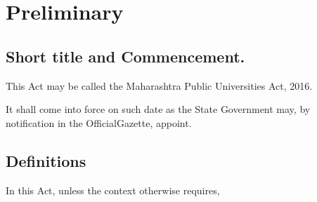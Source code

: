 \documentclass[default]{mhact}
\begin{document}
      \chapter{Preliminary}
      

      \section{Short title and Commencement.}
      

      \begin{subsectionlist}
    

This Act may be called the Maharashtra Public Universities Act, 2016.


It shall come into force on such date as the State Government may, by notification in the OfficialGazette, appoint.

       \end{subsectionlist}
    
      \section{Definitions}
      
In this Act, unless the context otherwise requires,
\end{document}

